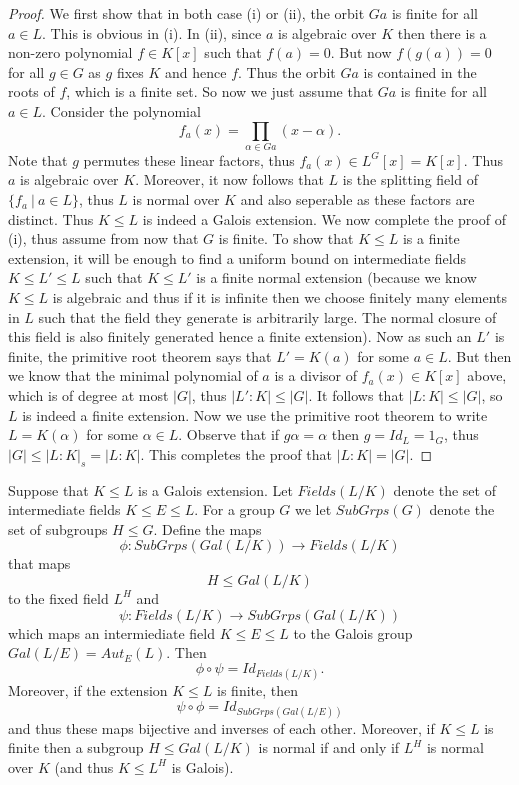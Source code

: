 \documentclass[twoside, a4paper, 10pt]{amsart}
\begin{document}
\begin{proof} We first show that in  both case (i) or (ii), the orbit $Ga$ is finite for all $a \in L$. This is obvious in (i). In (ii), since $a$ is algebraic over $K$ then there is a non-zero polynomial $f \in K[x]$ such that $f(a) = 0$. But now $f(g(a)) = 0$ for all $g \in G$ as $g$ fixes $K$ and hence $f$. Thus the orbit $Ga$ is contained in the roots of $f$, which is a finite set. So now we just assume that $Ga$ is finite for all $a \in L$. Consider the polynomial $$f_a(x) = \prod_{\alpha \in Ga} (x - \alpha).$$ Note that $g$ permutes these linear factors, thus $f_a(x) \in L^G[x] = K[x]$. Thus $a$ is algebraic over $K$. Moreover, it now follows that $L$ is the splitting field of $\{f_a ~|~ a \in L\}$, thus $L$ is normal over $K$ and also seperable as these factors are distinct. Thus $K \leq L$ is indeed a Galois extension.  We now complete the proof of (i), thus assume from now that $G$ is finite. To show that $K \leq L$ is a finite extension, it will be enough to find a uniform bound on intermediate fields $K \leq L' \leq L$ such that $K \leq L'$ is a finite normal extension (because we know $K \leq L$ is algebraic and thus if it is infinite then we choose finitely many elements in $L$ such that the field they generate is arbitrarily large. The normal closure of this field is also finitely generated hence a finite extension). Now as such an $L'$ is finite, the primitive root theorem says that $L' = K(a)$ for some $a \in L$. But then we know that the minimal polynomial of $a$ is a divisor of $f_a(x) \in K[x]$ above, which is of degree at most $|G|$, thus $|L':K| \leq |G|$. It follows that $|L:K| \leq |G|$, so $L$ is indeed a finite extension. Now we use the primitive root theorem to write $L = K(\alpha)$ for some $\alpha \in L$. Observe that if $g \alpha = \alpha$ then $g = Id_L = 1_G$, thus $|G| \leq |L:K|_s = |L:K|$. This completes the proof that $|L:K| = |G|$. \end{proof}

\begin{thm} Suppose that $K \leq L$ is a Galois extension. Let $Fields(L/K)$ denote the set of intermediate fields $K \leq E \leq L$. For a group $G$ we let $SubGrps(G)$ denote the set of subgroups $H \leq G$. Define the maps $$\phi: SubGrps(Gal(L/K)) \to Fields(L/K)$$ that maps $$H \leq Gal(L/K)$$ to the fixed field $L^H$ and $$\psi:Fields(L/K) \to SubGrps(Gal(L/K)) $$ which maps an intermiediate field $K \leq E \leq L$ to the Galois group $Gal(L/E) = Aut_E(L)$. Then $$\phi \circ \psi = Id_{Fields(L/K)}.$$ Moreover, if the extension $K \leq L$ is finite, then $$\psi \circ \phi = Id_{SubGrps(Gal(L/E))}$$ and thus these maps bijective and inverses of each other. Moreover, if $K \leq L$ is finite then a subgroup $H \leq Gal(L/K)$ is normal if and only if $L^H$ is normal over $K$ (and thus $K \leq L^H$ is Galois).

\end{thm}
\end{document}
